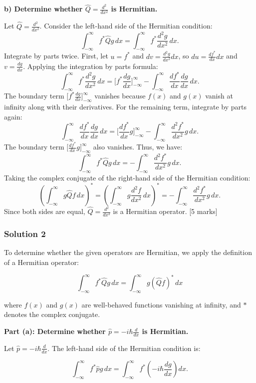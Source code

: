 \documentclass{article}
\begin{document}
\textbf{b) Determine whether $\hat{Q} = \frac{d^2}{dx^2}$ is Hermitian.}

Let $\hat{Q} = \frac{d^2}{dx^2}$. Consider the left-hand side of the Hermitian condition:
\[
\int_{-\infty}^\infty f^* \hat{Q} g \, dx = \int_{-\infty}^\infty f^* \frac{d^2 g}{dx^2} \, dx.
\]
Integrate by parts twice. First, let $u = f^*$ and $dv = \frac{d^2 g}{dx^2} dx$, so $du = \frac{df^*}{dx} dx$ and $v = \frac{dg}{dx}$. Applying the integration by parts formula:
\[
\int_{-\infty}^\infty f^* \frac{d^2 g}{dx^2} \, dx = \Big[ f^* \frac{dg}{dx} \Big]_{-\infty}^\infty - \int_{-\infty}^\infty \frac{df^*}{dx} \frac{dg}{dx} \, dx.
\]
The boundary term $\Big[ f^* \frac{dg}{dx} \Big]_{-\infty}^\infty$ vanishes because $f(x)$ and $g(x)$ vanish at infinity along with their derivatives. For the remaining term, integrate by parts again:
\[
\int_{-\infty}^\infty \frac{df^*}{dx} \frac{dg}{dx} \, dx = \Big[ \frac{df^*}{dx} g \Big]_{-\infty}^\infty - \int_{-\infty}^\infty \frac{d^2 f^*}{dx^2} g \, dx.
\]
The boundary term $\Big[ \frac{df^*}{dx} g \Big]_{-\infty}^\infty$ also vanishes. Thus, we have:
\[
\int_{-\infty}^\infty f^* \hat{Q} g \, dx = -\int_{-\infty}^\infty \frac{d^2 f^*}{dx^2} g \, dx.
\]
Taking the complex conjugate of the right-hand side of the Hermitian condition:
\[
\left(\int_{-\infty}^\infty g \hat{Q} f \, dx \right)^* = \left(\int_{-\infty}^\infty g \frac{d^2 f}{dx^2} \, dx \right)^* = -\int_{-\infty}^\infty \frac{d^2 f^*}{dx^2} g \, dx.
\]
Since both sides are equal, $\hat{Q} = \frac{d^2}{dx^2}$ is a Hermitian operator. \hfill [5 marks]


\subsubsection{Solution 2}
To determine whether the given operators are Hermitian, we apply the definition of a Hermitian operator:

\[
\int_{-\infty}^\infty f^* \hat{Q} g \, dx = \int_{-\infty}^\infty g (\hat{Q} f)^* \, dx
\]

where $f(x)$ and $g(x)$ are well-behaved functions vanishing at infinity, and $*$ denotes the complex conjugate.

\textbf{Part (a): Determine whether $\hat{p} = -i\hbar \frac{d}{dx}$ is Hermitian.}

Let $\hat{p} = -i\hbar \frac{d}{dx}$. The left-hand side of the Hermitian condition is:

\[
\int_{-\infty}^\infty f^* \hat{p} g \, dx = \int_{-\infty}^\infty f^* \left(-i\hbar \frac{d g}{dx}\right) dx.
\]
\end{document}
